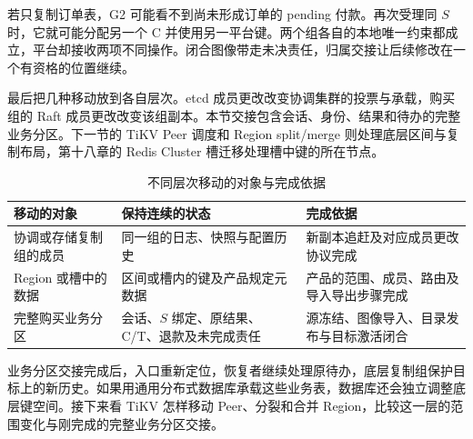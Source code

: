 若只复制订单表，G2 可能看不到尚未形成订单的 pending 付款。再次受理同 $S$ 时，它就可能分配另一个 C 并使用另一平台键。两个组各自的本地唯一约束都成立，平台却接收两项不同操作。闭合图像带走未决责任，归属交接让后续修改在一个有资格的位置继续。

最后把几种移动放到各自层次。etcd 成员更改改变协调集群的投票与承载，购买组的 Raft 成员更改改变该组副本。本节交接包含会话、身份、结果和待办的完整业务分区。下一节的 TiKV Peer 调度和 Region split/merge 则处理底层区间与复制布局，第十八章的 Redis Cluster 槽迁移处理槽中键的所在节点。

\begin{table}[htbp]\centering\small
\begin{tabularx}{\linewidth}{@{}p{.22\linewidth}XX@{}}
\toprule
移动的对象 & 保持连续的状态 & 完成依据\\
\midrule
协调或存储复制组的成员 & 同一组的日志、快照与配置历史 & 新副本追赶及对应成员更改协议完成\\
Region 或槽中的数据 & 区间或槽内的键及产品规定元数据 & 产品的范围、成员、路由及导入导出步骤完成\\
完整购买业务分区 & 会话、$S$ 绑定、原结果、C/T、退款及未完成责任 & 源冻结、图像导入、目录发布与目标激活闭合\\
\bottomrule
\end{tabularx}
\caption{不同层次移动的对象与完成依据}\label{tab:ch17-moves}
\end{table}
\FloatBarrier

业务分区交接完成后，入口重新定位，恢复者继续处理原待办，底层复制组保护目标上的新历史。如果用通用分布式数据库承载这些业务表，数据库还会独立调整底层键空间。接下来看 TiKV 怎样移动 Peer、分裂和合并 Region，比较这一层的范围变化与刚完成的完整业务分区交接。
\FloatBarrier
